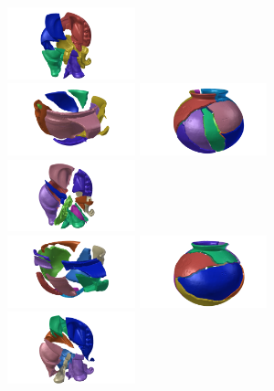 \documentclass[acmlarge,screen,dvipsnames]{acmart}
\begin{document}
\begin{figure}[htb]
  \includegraphics[width=0.33\textwidth]{images/elephantpuzzle1}\\
  \includegraphics[width=0.33\textwidth]{images/ambercuppuzzle4}%
  \includegraphics[width=0.33\textwidth]{images/saltdeanpuzzle2}%
  \includegraphics[width=0.33\textwidth]{images/elephantpuzzle2}\\
  \includegraphics[width=0.33\textwidth]{images/ambercuppuzzle5}%
  \includegraphics[width=0.33\textwidth]{images/saltdeanpuzzle3}%
  \includegraphics[width=0.33\textwidth]{images/elephantpuzzle3}\\

\end{figure}
\end{document}
